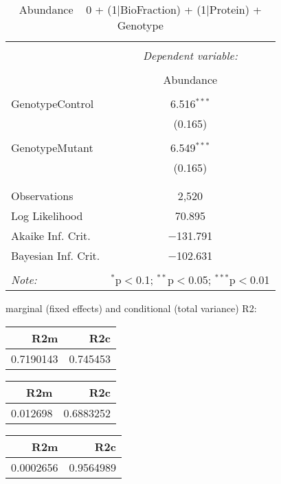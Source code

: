 \documentclass[11pt]{report}
\begin{document}
\begin{table}[!htbp] \centering 
  \caption{Abundance ~ 0 + (1|BioFraction) + (1|Protein) + Genotype} 
  \label{} 
\begin{tabular}{@{\extracolsep{5pt}}lc} 
\\[-1.8ex]\hline 
\hline \\[-1.8ex] 
 & \multicolumn{1}{c}{\textit{Dependent variable:}} \\ 
\cline{2-2} 
\\[-1.8ex] & Abundance \\ 
\hline \\[-1.8ex] 
 GenotypeControl & 6.516$^{***}$ \\ 
  & (0.165) \\ 
  & \\ 
 GenotypeMutant & 6.549$^{***}$ \\ 
  & (0.165) \\ 
  & \\ 
\hline \\[-1.8ex] 
Observations & 2,520 \\ 
Log Likelihood & 70.895 \\ 
Akaike Inf. Crit. & $-$131.791 \\ 
Bayesian Inf. Crit. & $-$102.631 \\ 
\hline 
\hline \\[-1.8ex] 
\textit{Note:}  & \multicolumn{1}{r}{$^{*}$p$<$0.1; $^{**}$p$<$0.05; $^{***}$p$<$0.01} \\ 
\end{tabular} 
\end{table} 
marginal (fixed effects) and conditional (total variance) R2:

\begin{tabular}{r|r}
\hline
R2m & R2c\\
\hline
0.7190143 & 0.745453\\
\hline
\end{tabular}

\begin{tabular}{r|r}
\hline
R2m & R2c\\
\hline
0.012698 & 0.6883252\\
\hline
\end{tabular}

\begin{tabular}{r|r}
\hline
R2m & R2c\\
\hline
0.0002656 & 0.9564989\\
\hline
\end{tabular}
\end{document}
